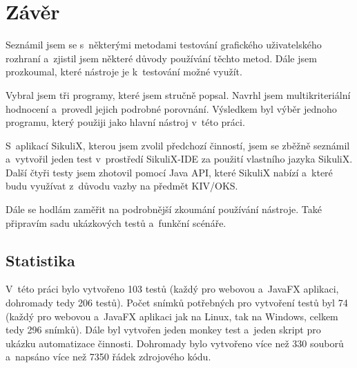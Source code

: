 \chapter{Závěr}
Seznámil jsem se s~některými metodami testování grafického uživatelského rozhraní a~zjistil jsem některé důvody používání těchto metod. Dále jsem prozkoumal, které nástroje je k~testování možné využít.

Vybral jsem tři programy, které jsem stručně popsal. Navrhl jsem multikriteriální hodnocení a~provedl jejich podrobné porovnání. Výsledkem byl výběr jednoho programu, který použiji jako hlavní nástroj v~této práci.

S~aplikací SikuliX, kterou jsem zvolil předchozí činností, jsem se zběžně seznámil a~vytvořil jeden test v~prostředí SikuliX-IDE za použití vlastního jazyka SikuliX. Další čtyři testy jsem zhotovil pomocí Java API, které SikuliX nabízí a~které budu využívat z~důvodu vazby na předmět KIV/OKS.

Dále se hodlám zaměřit na podrobnější zkoumání používání nástroje. Také připravím sadu ukázkových testů a~funkční scénáře.

\section{Statistika}
V~této práci bylo vytvořeno 103 testů (každý pro webovou a~JavaFX aplikaci, dohromady tedy 206 testů). Počet snímků potřebných pro vytvoření testů byl 74 (každý pro webovou a~JavaFX aplikaci jak na Linux, tak na Windows, celkem tedy 296 snímků). Dále byl vytvořen jeden monkey test a~jeden skript pro ukázku automatizace činnosti. Dohromady bylo vytvořeno více než 330 souborů a~napsáno více než 7350 řádek zdrojového kódu.